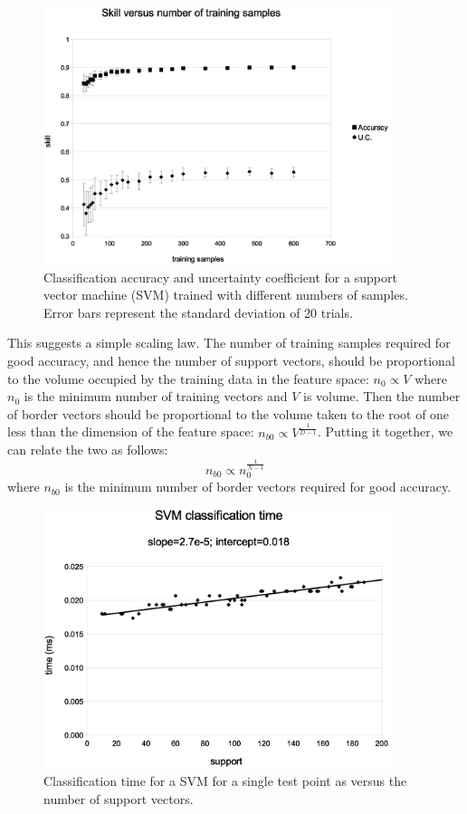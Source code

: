\documentclass[11pt]{article}
\begin{document}
\begin{figure}
\includegraphics[width=0.9\textwidth]{skill_v_nt}
\caption{Classification accuracy and uncertainty coefficient for a support vector machine (SVM) trained with different numbers of samples.
Error bars represent the standard deviation of 20 trials.}
\label{skill_v_nt}
\end{figure}

This suggests a simple scaling law. The number of training samples required
for good accuracy, and hence the number of support vectors, 
should be proportional to the volume occupied by the
training data in the feature space: $n_0 \propto V$ where 
$n_0$ is the minimum number of training vectors and $V$ is volume.
Then the number of border vectors should be proportional to the volume
taken to the root of one less than the dimension of the feature space:
$n_{b0} \propto V^\frac{1}{D-1}$.
Putting it together, we can relate the two as follows:
\begin{equation}
	n_{b0} \propto n_0^\frac{1}{N-1}
\end{equation}
where $n_{b0}$ is the minimum number of border vectors required for good
accuracy.

\begin{figure}
\includegraphics[width=0.9\textwidth]{svm_time}
\caption{Classification time for a SVM for a single test point as versus the number of support vectors.}
\label{svm_time}
\end{figure}
\end{document}
